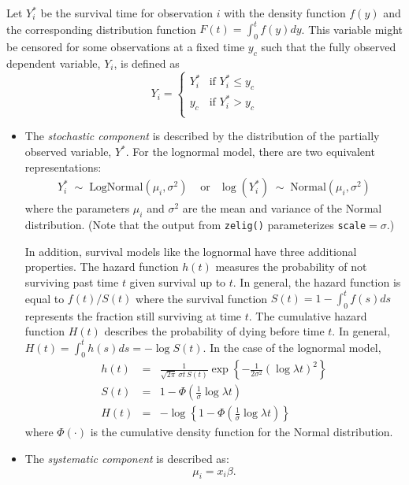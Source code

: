 Let $Y_i^*$ be the survival time for observation $i$ with the density
function $f(y)$ and the corresponding distribution function
$F(t)=\int_{0}^t f(y) dy$. This variable might be censored for some
observations at a fixed time $y_c$ such that the fully observed
dependent variable, $Y_i$, is defined as
\begin{equation*}
  Y_i = \left\{ \begin{array}{ll}
      Y_i^* & \textrm{if }Y_i^* \leq y_c \\
      y_c & \textrm{if }Y_i^* > y_c \\
    \end{array} \right.
\end{equation*}

\begin{itemize}
\item The \emph{stochastic component} is described by the distribution
  of the partially observed variable, $Y^*$.  For the lognormal model,
there are two equivalent representations:  
  \begin{eqnarray*}
    Y_i^* \; \sim \; \textrm{LogNormal}(\mu_i, \sigma^2) & \textrm{ or
} & \log(Y_i^*) \; \sim \; \textrm{Normal}(\mu_i, \sigma^2)
\end{eqnarray*}
where the parameters $\mu_i$ and $\sigma^2$ are the mean and variance
of the Normal distribution. (Note that the output from {\tt zelig()}
parameterizes {\tt scale}$ = \sigma$.)

 In addition, survival models like the lognormal have three additional
properties. The hazard function $h(t)$ measures the probability of not surviving
  past time $t$ given survival up to $t$. In general, the hazard
  function is equal to $f(t)/S(t)$ where the survival function $S(t) =
  1 - \int_{0}^t f(s) ds$ represents the fraction still surviving at
  time $t$.  The cumulative hazard function $H(t)$ describes the
  probability of dying before time $t$.  In general, $H(t)=
\int_{0}^{t} h(s) ds = -\log S(t)$. In the case of the lognormal model, 
\begin{eqnarray*}
h(t) &=& \frac{1}{\sqrt{2 \pi} \, \sigma t \, S(t)}
\exp\left\{-\frac{1}{2 \sigma^2} (\log \lambda t)^2\right\} \\
S(t) &=& 1 - \Phi\left(\frac{1}{\sigma} \log \lambda t\right) \\
H(t) &=& -\log \left\{ 1 - \Phi\left(\frac{1}{\sigma} \log \lambda t\right) \right\}
\end{eqnarray*}
where $\Phi(\cdot)$ is the cumulative density function for the Normal
distribution.  

\item The \emph{systematic component} is described as: 
\begin{equation*}
\mu_i = x_i \beta .
\end{equation*}

\end{itemize}

